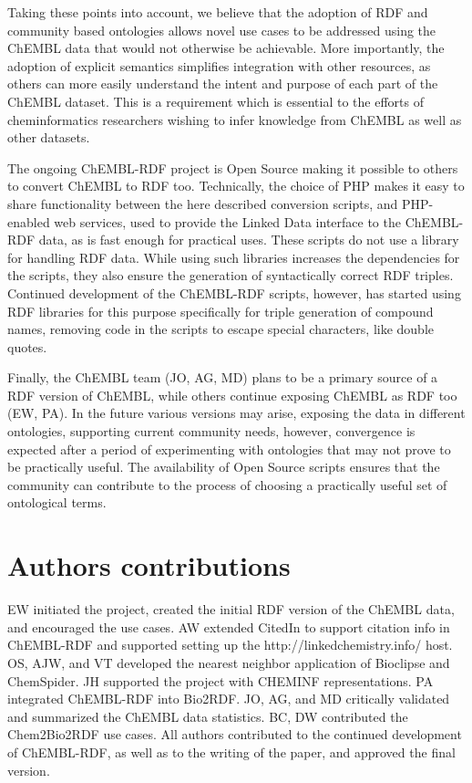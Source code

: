 \documentclass[10pt]{bmc_article}
\newenvironment{bmcformat}{\begin{raggedright}\baselineskip20pt\sloppy\setboolean{publ}{false}}{\end{raggedright}\baselineskip20pt\sloppy}
\begin{document}
\begin{bmcformat}
Taking these points into account, we believe that the adoption of RDF and community based ontologies allows
novel use cases to be addressed using the ChEMBL data that would not otherwise be achievable. More importantly, the adoption of explicit
semantics simplifies integration with other resources, as others can more easily understand the intent and purpose of each part of the ChEMBL dataset.
This is a requirement which is essential to the efforts of cheminformatics researchers wishing to infer knowledge
from ChEMBL as well as other datasets.

The ongoing ChEMBL-RDF project is Open Source making it possible to others to convert ChEMBL to RDF too.
Technically, the choice of PHP makes it easy to share functionality between the
here described conversion scripts, and PHP-enabled web services, used to provide the Linked
Data interface to the ChEMBL-RDF data, as is fast enough for practical uses. These scripts do
not use a library for handling RDF data. While using such libraries increases the dependencies
for the scripts, they also ensure the generation of syntactically correct RDF triples. Continued
development of the ChEMBL-RDF scripts, however, has started using RDF libraries for this purpose
specifically for triple generation of compound names, removing code in the scripts to escape
special characters, like double quotes.

Finally, the ChEMBL team (JO, AG, MD) plans to be a primary source of a RDF version of ChEMBL, while others continue
exposing ChEMBL as RDF too (EW, PA). In the future various versions may arise, exposing the data in different ontologies,
supporting current community needs, however, convergence is expected after a period of experimenting with ontologies that
may not prove to be practically useful. The availability of Open Source scripts ensures that the community can contribute to the
process of choosing a practically useful set of ontological terms.

\section*{Authors contributions}
EW initiated the project, created the initial RDF version of the ChEMBL data, and encouraged the use cases.
AW extended CitedIn to support citation info in ChEMBL-RDF and supported setting up the http://linkedchemistry.info/ host.
OS, AJW, and VT developed the nearest neighbor application of Bioclipse and ChemSpider.
JH supported the project with CHEMINF representations. PA integrated ChEMBL-RDF into Bio2RDF.
JO, AG, and MD critically validated and summarized the ChEMBL data statistics.
BC, DW contributed the Chem2Bio2RDF use cases.
All authors contributed to the continued development of ChEMBL-RDF, as well as to the writing of the paper,
and approved the final version.


\end{bmcformat}
\end{document}
